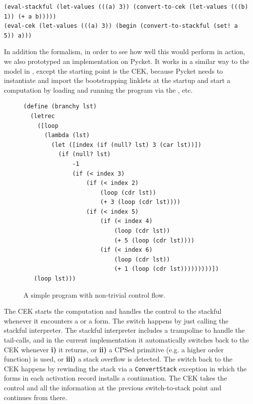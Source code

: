 \begin{verbatim}
(eval-stackful (let-values (((a) 3)) (convert-to-cek (let-values (((b) 1)) (+ a b)))))
(eval-cek (let-values (((a) 3)) (begin (convert-to-stackful (set! a 5)) a)))
\end{verbatim}

In addition the formalism, in order to see how well this would perform
in action, we also prototyped an implementation on Pycket. It works in
a similar way to the model in , except
the starting point is the CEK, because Pycket needs to instantiate and
import the bootstrapping linklets at the startup and start a
computation by loading and running the program via the
,  etc.

\begin{figure}
  \vspace{-0.7cm}
\small
\begin{lstlisting}[mathescape]
(define (branchy lst)
  (letrec
    ([loop
      (lambda (lst)
        (let ([index (if (null? lst) 3 (car lst))])
          (if (null? lst)
              -1
              (if (< index 3)
                  (if (< index 2)
                      (loop (cdr lst))
                      (+ 3 (loop (cdr lst))))
                  (if (< index 5)
                      (if (< index 4)
                          (loop (cdr lst))
                          (+ 5 (loop (cdr lst))))
                      (if (< index 6)
                          (loop (cdr lst))
                          (+ 1 (loop (cdr lst)))))))))])
   (loop lst)))
\end{lstlisting}
\caption{A simple program with non-trivial control flow.}
\label{fig:branchy}
\end{figure}

The CEK starts the computation and handles the control to the stackful
whenever it encounters a  or a 
form. The switch happens by just calling the stackful interpreter. The
stackful interpreter includes a trampoline to handle the tail-calls,
and in the current implementation it automatically switches back to
the CEK whenever \textbf{i)} it returns, or \textbf{ii)} a CPSed
primitive (e.g. a higher order function) is used, or \textbf{iii)} a
stack overflow is detected. The switch back to the CEK happens by
rewinding the stack via a \verb|ConvertStack| exception in which the
forms in each activation record installs a continuation. The CEK takes
the control and all the information at the previous switch-to-stack
point and continues from there.

